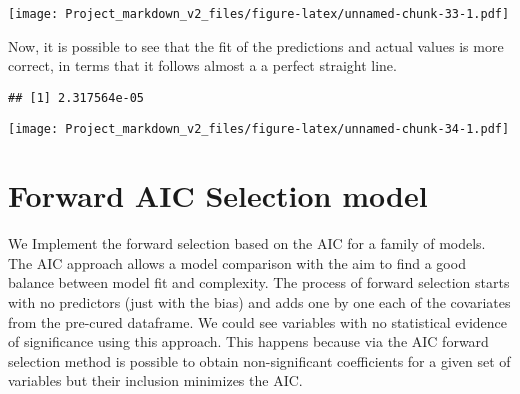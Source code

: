 \documentclass[
]{article}
\begin{document}
\texttt{[image: Project\_markdown\_v2\_files/figure-latex/unnamed-chunk-33-1.pdf]}

Now, it is possible to see that the fit of the predictions and actual
values is more correct, in terms that it follows almost a a perfect
straight line.

\begin{verbatim}
## [1] 2.317564e-05
\end{verbatim}

\texttt{[image: Project\_markdown\_v2\_files/figure-latex/unnamed-chunk-34-1.pdf]}

\section{Forward AIC Selection model}\label{forward-aic-selection-model}

We Implement the forward selection based on the AIC for a family of
models. The AIC approach allows a model comparison with the aim to find
a good balance between model fit and complexity. The process of forward
selection starts with no predictors (just with the bias) and adds one by
one each of the covariates from the pre-cured dataframe. We could see
variables with no statistical evidence of significance using this
approach. This happens because via the AIC forward selection method is
possible to obtain non-significant coefficients for a given set of
variables but their inclusion minimizes the AIC.
\end{document}
